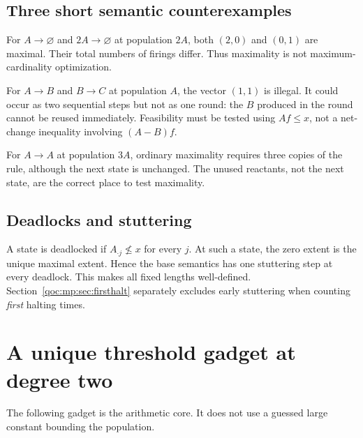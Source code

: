 \documentclass[11pt,letterpaper]{article}
\theoremstyle{definition}
\theoremstyle{remark}
\begin{document}
\subsection{Three short semantic counterexamples}
For $A\to\varnothing$ and $2A\to\varnothing$ at population $2A$, both
$(2,0)$ and $(0,1)$ are maximal. Their total numbers of firings differ.
Thus maximality is not maximum-cardinality optimization.

For $A\to B$ and $B\to C$ at population $A$, the vector $(1,1)$ is
illegal. It could occur as two sequential steps but not as one round:
the $B$ produced in the round cannot be reused immediately. Feasibility
must be tested using $Af\le x$, not a net-change inequality involving
$(A-B)f$.

For $A\to A$ at population $3A$, ordinary maximality requires three
copies of the rule, although the next state is unchanged. The unused
reactants, not the next state, are the correct place to test maximality.

\subsection{Deadlocks and stuttering}
A state is deadlocked if $A_{\cdot j}\not\le x$ for every $j$. At such a
state, the zero extent is the unique maximal extent. Hence the base
semantics has one stuttering step at every deadlock. This makes all fixed
lengths well-defined. Section~\ref{qoc:mp:sec:firsthalt} separately excludes early
stuttering when counting \emph{first} halting times.

\section{A unique threshold gadget at degree two}\label{qoc:mp:sec:gadget}
The following gadget is the arithmetic core. It does not use a guessed
large constant bounding the population.
\end{document}
